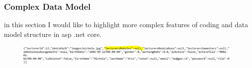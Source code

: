 \documentclass{scrartcl}
\begin{document}


\subsubsection{Complex Data Model}
in this section I would like to highlight more complex features of coding and data model structure in asp .net core.\\

\noindent                                                                %
\begin{minipage}{\linewidth}                            %
\label{visina8                                                      }%
\end{minipage}



\begin{figure}[H]
\centering
\includegraphics[width=150mm]{report_img/complex_data_problem/michele_module_null}
\caption{}
\label{blabla}
\end{figure}

\noindent                                                                %
\begin{minipage}{\linewidth}                            %
\label{visina8                                                      }%
\end{minipage}
\end{document}

